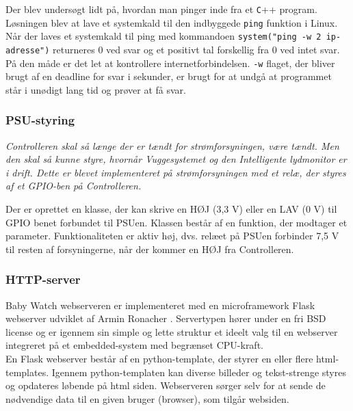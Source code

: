 Der blev undersøgt lidt på, hvordan man pinger inde fra et \verb+C+++ program. Løsningen blev at lave et systemkald til den indbyggede \verb+ping+ funktion i Linux. Når der laves et systemkald til ping med kommandoen \verb+system("ping -w 2 ip-adresse")+ returneres 0 ved svar og et positivt tal forskellig fra 0 ved intet svar. På den måde er det let at kontrollere internetforbindelsen. \verb+-w+ flaget, der bliver brugt af en deadline for svar i sekunder, er brugt for at undgå at programmet står i unødigt lang tid og prøver at få svar.

\subsubsection*{PSU-styring}

\textit{Controlleren skal så længe der er tændt for strømforsyningen, være tændt. Men den skal så kunne styre, hvornår Vuggesystemet og den Intelligente lydmonitor er i drift. Dette er blevet implementeret på strømforsyningen med et relæ, der styres af et GPIO-ben på Controlleren.}

Der er oprettet en klasse, der kan skrive en HØJ (3,3 V) eller en LAV (0 V) til GPIO benet forbundet til PSUen. Klassen består af en funktion, der modtager et parameter. Funktionaliteten er aktiv høj, dvs. relæet på PSUen forbinder 7,5 V til resten af forsyningerne, når der kommer en HØJ fra Controlleren.

\subsubsection*{HTTP-server}

Baby Watch webserveren er implementeret med en microframework Flask webserver udviklet af Armin Ronacher \citep{website:flask}. Servertypen hører under en fri BSD license \citep{website:BCD} og er igennem sin simple og lette struktur et ideelt valg til en webserver integreret på et embedded-system med begrænset CPU-kraft. \\
En Flask webserver består af en python-template, der styrer en eller flere html-templates. Igennem python-templaten kan diverse billeder og tekst-strenge styres og opdateres løbende på html siden. Webserveren sørger selv for at sende de nødvendige data til en given bruger (browser), som tilgår websiden. 

